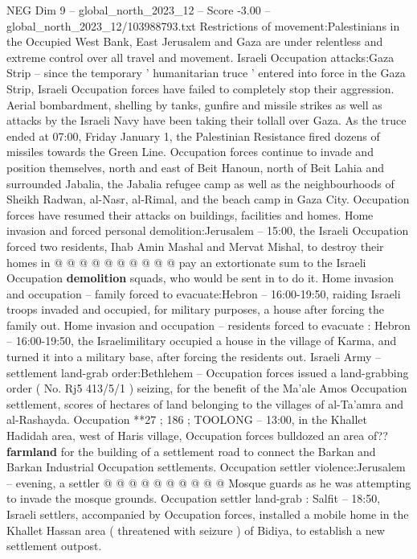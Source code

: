 \begin{textsample}{NEG Dim 9 – global\_north\_2023\_12 – Score -3.00 – global\_north\_2023\_12/103988793.txt}  \label{ex:f9_neg_286}
Restrictions of movement:Palestinians in the Occupied West Bank, East Jerusalem and Gaza are under relentless and extreme control over all travel and movement.
Israeli Occupation attacks:Gaza Strip -- since the temporary ' humanitarian truce ' entered into force in the Gaza Strip, Israeli Occupation forces have failed to completely stop their aggression.
Aerial bombardment, shelling by tanks, gunfire and missile strikes as well as attacks by the Israeli Navy have been taking their tollall over Gaza.
As the truce ended at 07:00, Friday January 1, the Palestinian Resistance fired dozens of missiles towards the Green Line.
Occupation forces continue to invade and position themselves, north and east of Beit Hanoun, north of Beit Lahia and surrounded Jabalia, the Jabalia refugee camp as well as the neighbourhoods of Sheikh Radwan, al-Nasr, al-Rimal, and the beach camp in Gaza City.
Occupation forces have resumed their attacks on buildings, facilities and homes.
Home invasion and forced personal demolition:Jerusalem -- 15:00, the Israeli Occupation forced two residents, Ihab Amin Mashal and Mervat Mishal, to destroy their homes in @ @ @ @ @ @ @ @ @ @ pay an extortionate sum to the Israeli Occupation \textbf{demolition} squads, who would be sent in to do it.
Home invasion and occupation -- family forced to evacuate:Hebron -- 16:00-19:50, raiding Israeli troops invaded and occupied, for military purposes, a house after forcing the family out.
Home invasion and occupation -- residents forced to evacuate : Hebron -- 16:00-19:50, the Israelimilitary occupied a house in the village of Karma, and turned it into a military base, after forcing the residents out.
Israeli Army -- settlement land-grab order:Bethlehem -- Occupation forces issued a land-grabbing order ( No.
Rj5 413/5/1 ) seizing, for the benefit of the Ma'ale Amos Occupation settlement, scores of hectares of land belonging to the villages of al-Ta'amra and al-Rashayda.
Occupation **27 ; 186 ; TOOLONG -- 13:00, in the Khallet Hadidah area, west of Haris village, Occupation forces bulldozed an area of?? \textbf{farmland} for the building of a settlement road to connect the Barkan and Barkan Industrial Occupation settlements.
Occupation settler violence:Jerusalem -- evening, a settler @ @ @ @ @ @ @ @ @ @ Mosque guards as he was attempting to invade the mosque grounds.
Occupation settler land-grab : Salfit -- 18:50, Israeli settlers, accompanied by Occupation forces, installed a mobile home in the Khallet Hassan area ( threatened with seizure ) of Bidiya, to establish a new settlement outpost.

\end{textsample}
